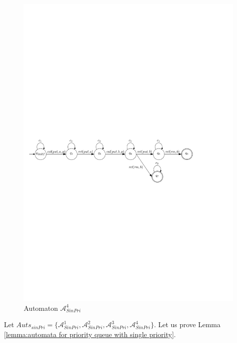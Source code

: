 \begin{figure}[htbp]
  \centering
  \includegraphics[width=0.9 \textwidth]{figures/PIC_AUTO_FIFO_4.pdf}
  \caption{Automaton $\mathcal{A}_{\textit{SinPri}}^4$}
  \label{fig:automata for FIFO-4}
\end{figure}

Let $\textit{Auts}_{\textit{sinPri}} = \{ \mathcal{A}_{\textit{SinPri}}^1, \mathcal{A}_{\textit{SinPri}}^2, \mathcal{A}_{\textit{SinPri}}^3, \mathcal{A}_{\textit{SinPri}}^4 \}$. Let us prove Lemma \ref{lemma:automata for priority queue with single priority}.

\AutoForPQwithSignlePri*

